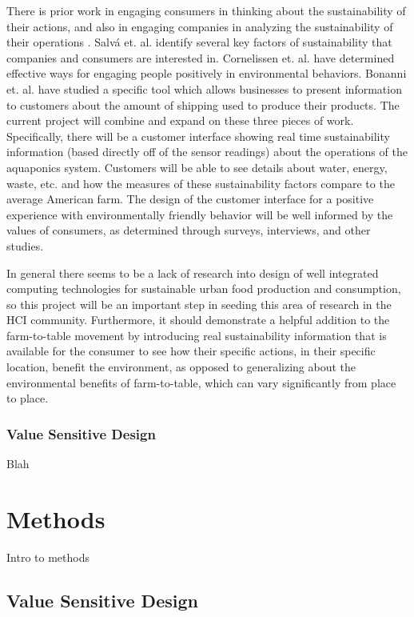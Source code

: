 \documentclass{sigchi}
\begin{document}
There is prior work \cite{smallBusiness, cueing} in engaging consumers in thinking about the sustainability of their actions, and also in engaging companies in analyzing the sustainability of their operations \cite{smallBusiness, audit}. Salv\'a et. al. identify several key factors of sustainability that companies and consumers are interested in. Cornelissen et. al. have determined effective ways for engaging people positively in environmental behaviors. Bonanni et. al. have studied a specific tool which allows businesses to present information to customers about the amount of shipping used to produce their products. The current project will combine and expand on these three pieces of work. Specifically, there will be a customer interface showing real time sustainability information (based directly off of the sensor readings) about the operations of the aquaponics system. Customers will be able to see details about water, energy, waste, etc. and how the measures of these sustainability factors compare to the average American farm. The design of the customer interface for a positive experience with environmentally friendly behavior will be well informed by the values of consumers, as determined through surveys, interviews, and other studies. 

In general there seems to be a lack of research into design of well integrated computing technologies for sustainable urban food production and consumption, so this project will be an important step in seeding this area of research in the HCI community. Furthermore, it should demonstrate a helpful addition to the farm-to-table movement by introducing real sustainability information that is available for the consumer to see how their specific actions, in their specific location, benefit the environment, as opposed to generalizing about the environmental benefits of farm-to-table, which can vary significantly from place to place.

\subsubsection{Value Sensitive Design}
Blah~\cite{VSD}\cite{moreVSD}

\section{Methods}

Intro to methods

\subsection{Value Sensitive Design}
\end{document}
